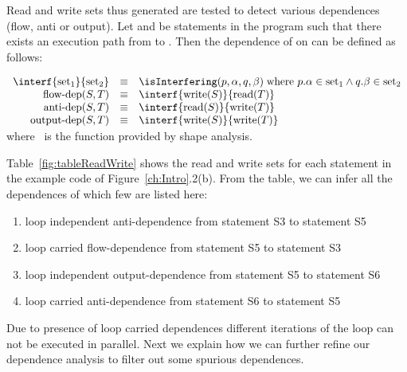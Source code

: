 Read and write sets thus generated are tested to detect 
various dependences (flow, anti or output). Let  and  
be statements in the program such that there exists an execution 
path from  to . Then the dependence of  on 
 can be defined as follows:

\newcommand{\flowdep}{\mbox{flow-dep}}
\newcommand{\antidep}{\mbox{anti-dep}}
\newcommand{\outputdep}{\mbox{output-dep}}
\newcommand{\rs}[1]{\mbox{read}(#1)}
\newcommand{\ws}[1]{\mbox{write}(#1)}
\newcommand{\rst}[2]{\mbox{read}(#1, #2)}
\newcommand{\wst}[2]{\mbox{write}(#1, #2)}
\newcommand{\set}{\mbox{set}}
\noindent

$\begin{array}{rcl}
\interf{\set_1}{\set_2} &\equiv& \isInterfering(p, \alpha, q,
\beta) \; \mbox{where } 
p.\alpha \in \set_1   \wedge  q.\beta \in \set_2 \\ 
\flowdep(S, T) &\equiv& \interf{\ws{S}}{\rs{T}} \\ 
\antidep(S, T) &\equiv& \interf{\rs{S}}{\ws{T}} \\
\outputdep(S, T) &\equiv& \interf{\ws{S}}{\ws{T}}
\end{array}$ \\
\noindent where \isInterfering\ is the function provided by
shape analysis.

\begin{example} {\label{ex:dep}\rm
Table~\ref{fig:tableReadWrite} shows the read and write sets for each statement in
the example code of Figure~\ref{ch:Intro}.2(b). From the table,
we can infer all the dependences of which few are listed here:
\begin{enumerate}
\item loop independent anti-dependence  from statement {S3} to
statement {S5}
\item loop carried flow-dependence  from statement {S5} to
statement {S3}
\item loop independent output-dependence from statement {S5} 
to statement {S6}
\item loop carried anti-dependence from statement {S6} to statement {S5}
\end{enumerate}  
Due to presence of loop carried dependences different iterations of the loop can not be executed in parallel. Next we explain how we can further refine our dependence
analysis to filter out some spurious dependences.
}
\hfill\psframebox{}  \end{example}


